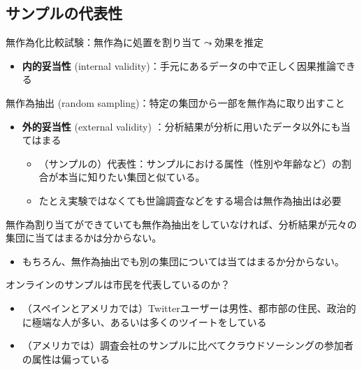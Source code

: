 \documentclass[
  xelatex,
  ja=standard]{bxjsarticle}
\providecommand{\tightlist}{%
  \setlength{\itemsep}{0pt}\setlength{\parskip}{0pt}}\usepackage{longtable,booktabs,array}
\begin{document}
\hypertarget{ux30b5ux30f3ux30d7ux30ebux306eux4ee3ux8868ux6027}{%
\subsection{サンプルの代表性}\label{ux30b5ux30f3ux30d7ux30ebux306eux4ee3ux8868ux6027}}

無作為化比較試験：無作為に処置を割り当て\(\leadsto\)効果を推定

\begin{itemize}
\tightlist
\item
  \textbf{内的妥当性} (internal
  validity)：手元にあるデータの中で正しく因果推論できる
\end{itemize}

無作為抽出 (random sampling)：特定の集団から一部を無作為に取り出すこと

\begin{itemize}
\tightlist
\item
  \textbf{外的妥当性} (external validity)
  ：分析結果が分析に用いたデータ以外にも当てはまる

  \begin{itemize}
  \tightlist
  \item
    （サンプルの）代表性：サンプルにおける属性（性別や年齢など）の割合が本当に知りたい集団と似ている。
  \item
    たとえ実験ではなくても世論調査などをする場合は無作為抽出は必要
  \end{itemize}
\end{itemize}

無作為割り当てができていても無作為抽出をしていなければ、分析結果が元々の集団に当てはまるかは分からない。

\begin{itemize}
\tightlist
\item
  もちろん、無作為抽出でも別の集団については当てはまるか分からない。
\end{itemize}

オンラインのサンプルは市民を代表しているのか？

\begin{itemize}
\tightlist
\item
  （スペインとアメリカでは）Twitterユーザーは男性、都市部の住民、政治的に極端な人が多い、あるいは多くのツイートをしている\citep{barbera2015b}
\item
  （アメリカでは）調査会社のサンプルに比べてクラウドソーシングの参加者の属性は偏っている\citep{weinberg2014}
\end{itemize}
\end{document}

